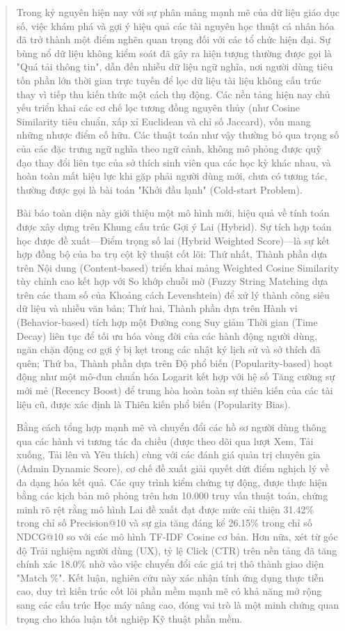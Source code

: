 \documentclass[journal]{IEEEtran}
\begin{document}
\begin{abstract}
Trong kỷ nguyên hiện nay với sự phân mảng mạnh mẽ của dữ liệu giáo dục số, 
việc khám phá và gợi ý hiệu quả các tài nguyên học thuật cá nhân hóa đã trở thành một điểm nghẽn quan trọng đối với các tổ chức hiện đại. 
Sự bùng nổ dữ liệu không kiểm soát đã gây ra hiện tượng thường được gọi là "Quá tải thông tin", 
dẫn đến nhiễu dữ liệu ngữ nghĩa, nơi người dùng tiêu tốn phần lớn thời gian trực tuyến để lọc dữ liệu tài liệu không cấu trúc thay vì tiếp thu kiến thức một cách thụ động. 
Các nền tảng hiện nay chủ yếu triển khai các cơ chế lọc tương đồng nguyên thủy 
(như Cosine Similarity tiêu chuẩn, xấp xỉ Euclidean và chỉ số Jaccard), vốn mang những nhược điểm cố hữu. 
Các thuật toán như vậy thường bỏ qua trọng số của các đặc trưng ngữ nghĩa theo ngữ cảnh, 
không mô phỏng được quỹ đạo thay đổi liên tục của sở thích sinh viên qua các học kỳ khác nhau, 
và hoàn toàn mất hiệu lực khi gặp phải người dùng mới, chưa có tương tác, thường được gọi là bài toán "Khởi đầu lạnh" (Cold-start Problem).

Bài báo toàn diện này giới thiệu một mô hình mới, hiệu quả về tính toán được xây dựng trên Khung cấu trúc Gợi ý Lai (Hybrid). 
Sự tích hợp toán học được đề xuất---Điểm trọng số lai (Hybrid Weighted Score)---là sự kết hợp đồng bộ của ba trụ cột kỹ thuật cốt lõi: 
Thứ nhất, Thành phần dựa trên Nội dung (Content-based) triển khai mảng Weighted Cosine Similarity tùy chỉnh cao kết hợp với So khớp chuỗi mờ (Fuzzy String Matching 
dựa trên các tham số của Khoảng cách Levenshtein) để xử lý thành công siêu dữ liệu và nhiễu văn bản; 
Thứ hai, Thành phần dựa trên Hành vi (Behavior-based) tích hợp một Đường cong Suy giảm Thời gian (Time Decay) liên tục để tối ưu hóa vòng đời của các hành động người dùng, 
ngăn chặn động cơ gợi ý bị kẹt trong các nhật ký lịch sử và sở thích đã quên; 
Thứ ba, Thành phần dựa trên Độ phổ biến (Popularity-based) hoạt động như một mô-đun chuẩn hóa Logarit kết hợp với hệ số Tăng cường sự mới mẻ (Recency Boost) 
để trung hòa hoàn toàn sự thiên kiến của các tài liệu cũ, được xác định là Thiên kiến phổ biến (Popularity Bias).

Bằng cách tổng hợp mạnh mẽ và chuyển đổi các hồ sơ người dùng thông qua các hành vi tương tác đa chiều 
(được theo dõi qua lượt Xem, Tải xuống, Tải lên và Yêu thích) cùng với các đánh giá quản trị chuyên gia (Admin Dynamic Score), 
cơ chế đề xuất giải quyết dứt điểm nghịch lý về đa dạng hóa kết quả. 
Các quy trình kiểm chứng tự động, được thực hiện bằng các kịch bản mô phỏng trên hơn 10.000 truy vấn thuật toán, 
chứng minh rõ rệt rằng mô hình Lai đề xuất đạt được mức cải thiện 31.42\% trong chỉ số Precision@10 
và sự gia tăng đáng kể 26.15\% trong chỉ số NDCG@10 so với các mô hình TF-IDF Cosine cơ bản. 
Hơn nữa, xét từ góc độ Trải nghiệm người dùng (UX), tỷ lệ Click (CTR) trên nền tảng đã tăng chính xác 18.0\% 
nhờ vào việc chuyển đổi các giá trị thô thành giao diện "Match \%". 
Kết luận, nghiên cứu này xác nhận tính ứng dụng thực tiễn cao, 
duy trì kiến trúc cốt lõi phần mềm mạnh mẽ có khả năng mở rộng sang các cấu trúc Học máy nâng cao, 
đóng vai trò là một minh chứng quan trọng cho khóa luận tốt nghiệp Kỹ thuật phần mềm.
\end{abstract}
\end{document}

